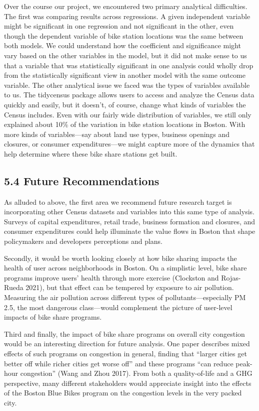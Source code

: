 \documentclass[
  12pt,
]{article}
\begin{document}
\begin{longtable}[]
Over the course our project, we encountered two primary analytical
difficulties. The first was comparing results across regressions. A
given independent variable might be significant in one regression and
not significant in the other, even though the dependent variable of bike
station locations was the same between both models. We could understand
how the coefficient and significance might vary based on the other
variables in the model, but it did not make sense to us that a variable
that was statistically significant in one analysis could wholly drop
from the statistically significant view in another model with the same
outcome variable. The other analytical issue we faced was the types of
variables available to us. The tidycensus package allows users to access
and analyze the Census data quickly and easily, but it doesn't, of
course, change what kinds of variables the Census includes. Even with
our fairly wide distribution of variables, we still only explained about
10\% of the variation in bike station locations in Boston. With more
kinds of variables---say about land use types, business openings and
closures, or consumer expenditures---we might capture more of the
dynamics that help determine where these bike share stations get built.

\hypertarget{future-recommendations}{%
\subsection{5.4 Future Recommendations}\label{future-recommendations}}

As alluded to above, the first area we recommend future research target
is incorporating other Census datasets and variables into this same type
of analysis. Surveys of capital expenditures, retail trade, business
formation and closures, and consumer expenditures could help illuminate
the value flows in Boston that shape policymakers and developers
perceptions and plans.

Secondly, it would be worth looking closely at how bike sharing impacts
the health of user across neighborhoods in Boston. On a simplistic
level, bike share programs improve users' health through more exercise
(Clockston and Rojas-Rueda 2021), but that effect can be tempered by
exposure to air pollution. Measuring the air pollution across different
types of pollutants---especially PM 2.5, the most dangerous
class---would complement the picture of user-level impacts of bike share
programs.

Third and finally, the impact of bike share programs on overall city
congestion would be an interesting direction for future analysis. One
paper describes mixed effects of such programs on congestion in general,
finding that ``larger cities get better off while richer cities get
worse off'' and these programs ``can reduce peak-hour congestion'' (Wang
and Zhou 2017). From both a quality-of-life and a GHG perspective, many
different stakeholders would appreciate insight into the effects of the
Boston Blue Bikes program on the congestion levels in the very packed
city.


\end{longtable}
\end{document}
